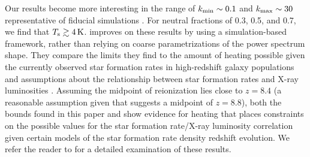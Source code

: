 \documentclass[twocolumn,numberedappendix]{emulateapj} \shorttitle{New Limits on the 21 cm Power Spectrum at $z=8.4$}
\newcommand{\Tspin}{T_{\rm s}}
\newcommand{\kmin}{k_{\rm min}}
\newcommand{\kmax}{k_{\rm max}}
\begin{document}
Our results become more interesting in the range of $\kmin\sim0.1$ and
$\kmax\sim30$ representative of fiducial simulations
\citep{zahn_et_al2007,lidz_et_al2008}.  For neutral fractions of 0.3, 0.5, and
0.7, we find that $\Tspin\gtrsim 4\,\text{K}$. \citet{pober_et_al2015} improves
on these results by using a simulation-based framework, rather than relying on
coarse parametrizations of the power spectrum shape.
They compare the limits they find 
to the amount of heating possible given the currently observed star
formation rates in high-redshift galaxy populations
\citep{bouwens_et_al2014,mcleod_et_al2014} and assumptions about the
relationship between star formation rates and X-ray luminosities
\citep{furlanetto_et_al2006,pritchard_loeb2008,fialkov_et_al2014}.
Assuming the
midpoint of reionization lies close to $z=8.4$ (a reasonable assumption given
that \citealt{planck_et_al2015} suggests a midpoint of $z=8.8$), both the bounds
found in this paper and \citet{pober_et_al2015} show evidence for 
heating that places constraints on the possible values for the star formation
rate/X-ray luminosity correlation given certain models of the star formation
rate density redshift evolution. We refer the reader
to \citet{pober_et_al2015} for a detailed examination of these results.




%

%
%
%
%
%
%
%
%
%
%
\end{document}
